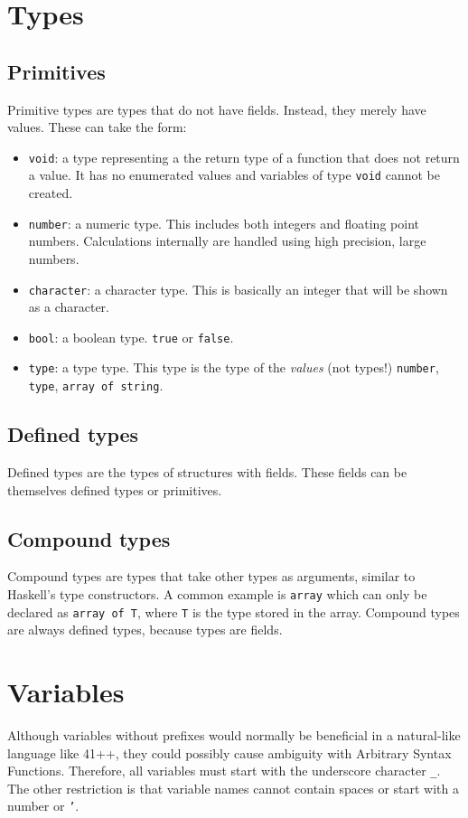 \documentclass{article}
\newcommand{\code}[1]{\texttt{#1}}
\begin{document}
\section{Types}
\subsection{Primitives}
Primitive types are types that do not have fields. Instead, they merely have values. These can take the form:
\begin{itemize}
\item \code{void}: a type representing a the return type of a function that does not return a value. It has no enumerated values and variables of type \code{void} cannot be created.
\item \code{number}: a numeric type. This includes both integers and floating point numbers. Calculations internally are handled using high precision, large numbers.
\item \code{character}: a character type. This is basically an integer that will be shown as a character.
\item \code{bool}: a boolean type. \code{true} or \code{false}.
\item \code{type}: a type type. This type is the type of the \emph{values} (not types!) \code{number}, \code{type}, \code{array of string}.
\end{itemize}
\subsection{Defined types}
Defined types are the types of structures with fields. These fields can be themselves defined types or primitives.
\subsection{Compound types}
Compound types are types that take other types as arguments, similar to Haskell's type constructors. A common example is \code{array} which can only be declared as \code{array of T}, where \code{T} is the type stored in the array. Compound types are always defined types, because types are fields.
\section{Variables}
Although variables without prefixes would normally be beneficial in a natural-like language like 41++, they could possibly cause ambiguity with Arbitrary Syntax Functions. Therefore, all variables must start with the underscore character \code{\_}. The other restriction is that variable names cannot contain spaces or start with a number or \code{'}. 
\end{document}
